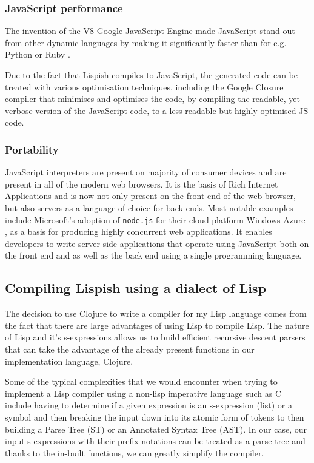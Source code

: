 \subsubsection{JavaScript performance}
The invention of the V8 Google JavaScript Engine made JavaScript stand out from other dynamic languages by making it significantly faster than for e.g. Python \cite{JavaScriptVSPython3} or Ruby \cite{JavaScriptVSRuby}.

Due to the fact that Lispish compiles to JavaScript, the generated code can be treated with various optimisation techniques, including the Google Closure compiler that minimises and optimises the code, by compiling the readable, yet verbose version of the JavaScript code, to a less readable but highly optimised JS code.

\subsubsection{Portability}\label{portability}
JavaScript interpreters are present on majority of consumer devices and are present in all of the modern web browsers. It is the basis of Rich Internet Applications and is now not only present on the front end of the web browser, but also servers as a language of choice for back ends.
Most notable examples include Microsoft's adoption of \texttt{node.js} for their cloud platform Windows Azure \cite{nodejs.WindowsAzure}, as a basis for producing highly concurrent web applications. It enables developers to write server-side applications that operate using JavaScript both on the front end and as well as the back end using a single programming language.

\subsection{Compiling Lispish using a dialect of Lisp}
The decision to use Clojure to write a compiler for my Lisp language comes from the fact that there are large advantages of using Lisp to compile Lisp.
The nature of Lisp and it's s-expressions allows us to build efficient recursive descent parsers that can take the advantage of the already present functions in our implementation language, Clojure.

Some of the typical complexities that we would encounter when trying to implement a Lisp compiler using a non-lisp imperative language such as C include having to determine if a given expression is an s-expression (list) or a symbol and then breaking the input down into its atomic form of tokens to then building a Parse Tree (ST) or an Annotated Syntax Tree (AST).
In our case, our input s-expressions with their prefix notations can be treated as a parse tree and thanks to the in-built functions, we can greatly simplify the compiler.

